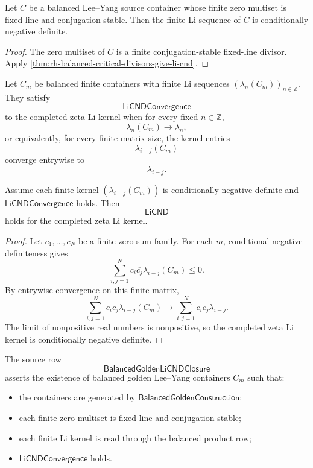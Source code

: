 \begin{corollary}
\label{cor:rh-balanced-finite-containers-give-li-cnd}
Let $C$ be a balanced Lee--Yang source container whose finite zero
multiset is fixed-line and conjugation-stable.  Then the finite Li
sequence of $C$ is conditionally negative definite.
\end{corollary}

\begin{proof}
The zero multiset of $C$ is a finite conjugation-stable fixed-line
divisor.  Apply
\autoref{thm:rh-balanced-critical-divisors-give-li-cnd}.
\end{proof}

\begin{definition}
\label{def:rh-li-cnd-convergence}
Let $C_m$ be balanced finite containers with finite Li sequences
$(\lambda_n(C_m))_{n\in\mathbb Z}$.  They satisfy
$$
\mathsf{LiCNDConvergence}
$$
to the completed zeta Li kernel when for every fixed $n\in\mathbb Z$,
$$
\lambda_n(C_m)\to\lambda_n,
$$
or equivalently, for every finite matrix size, the kernel entries
$$
\lambda_{i-j}(C_m)
$$
converge entrywise to
$$
\lambda_{i-j}.
$$
\end{definition}

\begin{theorem}
\label{thm:rh-cnd-closed-under-finite-kernel-limits}
Assume each finite kernel $(\lambda_{i-j}(C_m))$ is conditionally
negative definite and $\mathsf{LiCNDConvergence}$ holds.  Then
$$
\mathsf{LiCND}
$$
holds for the completed zeta Li kernel.
\end{theorem}

\begin{proof}
Let $c_1,\ldots,c_N$ be a finite zero-sum family.  For each $m$,
conditional negative definiteness gives
$$
\sum_{i,j=1}^N
c_i\overline{c_j}\lambda_{i-j}(C_m)
\le0.
$$
By entrywise convergence on this finite matrix,
$$
\sum_{i,j=1}^N
c_i\overline{c_j}\lambda_{i-j}(C_m)
\longrightarrow
\sum_{i,j=1}^N
c_i\overline{c_j}\lambda_{i-j}.
$$
The limit of nonpositive real numbers is nonpositive, so the completed
zeta Li kernel is conditionally negative definite.
\end{proof}

\begin{definition}
\label{def:rh-balanced-golden-li-cnd-closure}
The source row
$$
\mathsf{BalancedGoldenLiCNDClosure}
$$
asserts the existence of balanced golden Lee--Yang containers $C_m$ such
that:

\begin{itemize}
\item the containers are generated by
$\mathsf{BalancedGoldenConstruction}$;
\item each finite zero multiset is fixed-line and conjugation-stable;
\item each finite Li kernel is read through the balanced product row;
\item $\mathsf{LiCNDConvergence}$ holds.
\end{itemize}
\end{definition}


